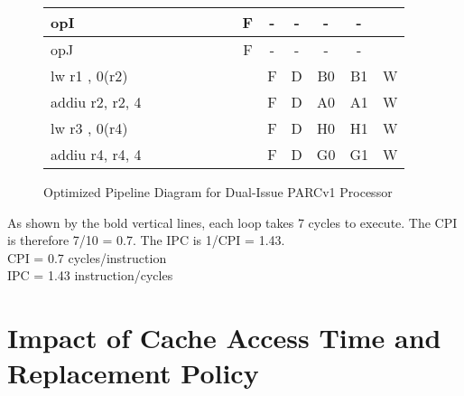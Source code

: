 \documentclass[10pt]{article}
\begin{document}
\begin{figure}[H]
{\begin{tabular}{|l|c|c|c|c!{\vrule width 1.5pt}c|c|c|c|c|c|c!{\vrule width 1.5pt}c|}
opI               &    &    &    &    &    &    & F  & -  & -  & -  & -  &    \\ \hline
opJ               &    &    &    &    &    &    & F  & -  & -  & -  & -  &    \\ \hline
lw r1 , 0(r2)     &    &    &    &    &    &    &    & F  & D  & B0 & B1 & W  \\ \hline
addiu r2, r2, 4   &    &    &    &    &    &    &    & F  & D  & A0 & A1 & W  \\ \hline
lw r3 , 0(r4)     &    &    &    &    &    &    &    & F  & D  & H0 & H1 & W  \\ \hline
addiu r4, r4, 4   &    &    &    &    &    &    &    & F  & D  & G0 & G1 & W  \\ \hline
\end{tabular}
}
\caption{Optimized Pipeline Diagram for Dual-Issue PARCv1 Processor}
\end{figure}

As shown by the bold vertical lines, each loop takes 7 cycles to execute. The CPI is therefore 7/10 = 0.7. The IPC is 1/CPI = 1.43.\\
CPI = 0.7 cycles/instruction\\
IPC = 1.43 instruction/cycles\\

\cleardoublepage
\section{Impact of Cache Access Time and Replacement Policy}
\end{document}
